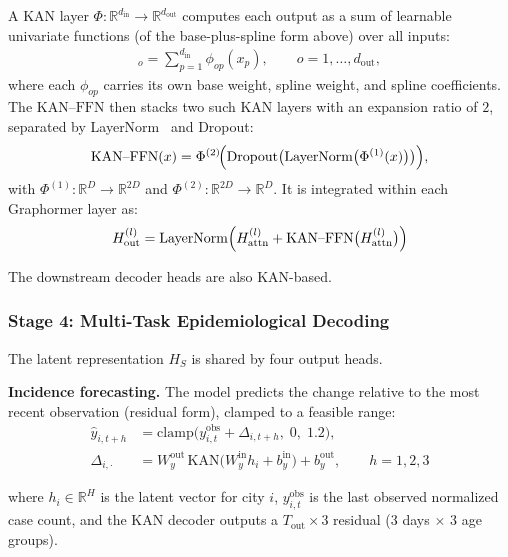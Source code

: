 \documentclass[10pt,letterpaper]{article}
\begin{document}
	\noindent A KAN layer $\Phi : \mathbb{R}^{d_{\mathrm{in}}} \to \mathbb{R}^{d_{\mathrm{out}}}$
	computes each output as a sum of learnable univariate functions (of the
	base-plus-spline form above) over all inputs:
	\begin{align*}
		[\Phi(x)]_o = \sum_{p=1}^{d_{\mathrm{in}}} \phi_{op}(x_p),
		\qquad o = 1, \dots, d_{\mathrm{out}},
	\end{align*}
	where each $\phi_{op}$ carries its own base weight, spline weight, and spline
	coefficients. The $\mathrm{KAN\textrm{--}FFN}$ then stacks two such KAN layers with
	an expansion ratio of $2$, separated by LayerNorm~\cite{ba2016} and Dropout:
	\begin{align*}
		\mathrm{KAN\textrm{--}FFN}(x)
		= \Phi^{(2)}\!\Bigl(
		\mathrm{Dropout}\bigl(\mathrm{LayerNorm}\bigl(\Phi^{(1)}(x)\bigr)\bigr)
		\Bigr),
	\end{align*}
	with $\Phi^{(1)}: \mathbb{R}^{D} \to \mathbb{R}^{2D}$ and
	$\Phi^{(2)}: \mathbb{R}^{2D} \to \mathbb{R}^{D}$. It is integrated within each
	Graphormer layer as:
	\begin{align*}
		H_{\mathrm{out}}^{(l)}
		= \mathrm{LayerNorm}\Bigl(
		H_{\mathrm{attn}}^{(l)} + \mathrm{KAN\textrm{--}FFN}\bigl(H_{\mathrm{attn}}^{(l)}\bigr)
		\Bigr)
	\end{align*}
	
	\noindent The downstream decoder heads are also KAN-based.
	
	\subsubsection*{Stage 4: Multi-Task Epidemiological Decoding}
	
	The latent representation $H_S$ is shared by four output heads.
	
	\noindent\textbf{Incidence forecasting.}
	The model predicts the change relative to the most recent observation (residual
	form), clamped to a feasible range:
	\begin{align*}
		\hat{y}_{i,t+h}
		&= \mathrm{clamp}\bigl( y_{i,t}^{\mathrm{obs}} + \Delta_{i,t+h},\; 0,\; 1.2 \bigr),
		\\[4pt]
		\Delta_{i,\cdot}
		&= W_y^{\mathrm{out}} \, \mathrm{KAN}\bigl(W_y^{\mathrm{in}} h_i + b_y^{\mathrm{in}}\bigr)
		+ b_y^{\mathrm{out}},
		\qquad h = 1, 2, 3
	\end{align*}
	
	\noindent where $h_i \in \mathbb{R}^{H}$ is the latent vector for city $i$,
	$y_{i,t}^{\mathrm{obs}}$ is the last observed normalized case count, and the KAN
	decoder outputs a $T_{\mathrm{out}} \times 3$ residual (3 days $\times$ 3 age groups).
	
\end{document}
